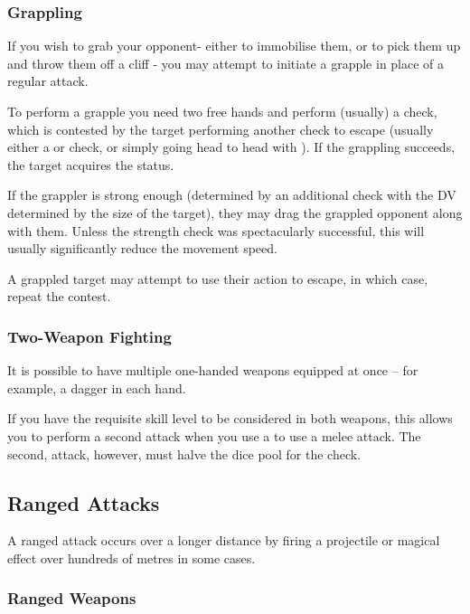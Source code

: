 \subsubsection{Grappling}

If you wish to grab your opponent- either to immobilise them, or to pick them up and throw them off a cliff - you may attempt to initiate a grapple in place of a regular attack. 

To perform a grapple you need two free hands and perform (usually) a  check, which is contested by the target performing another check to escape (usually either a  or  check, or simply going head to head with ). If the grappling succeeds, the target acquires the  status. 

If the grappler is strong enough (determined by an additional  check with the DV determined by the size of the target), they may drag the grappled opponent along with them. Unless the strength check was spectacularly successful, this will usually significantly reduce the movement speed. 

A grappled target may attempt to use their action to escape, in which case, repeat the contest. 

\subsubsection{Two-Weapon Fighting}

It is possible to have multiple one-handed weapons equipped at once -- for example, a dagger in each hand. 

If you have the requisite skill level to be considered  in both weapons, this allows you to perform a second attack when you use a  to use a melee attack. The second, attack, however, must halve the dice pool for the check.


\subsection{Ranged Attacks}

A ranged attack occurs over a longer distance by firing a projectile or magical effect over hundreds of metres in some cases. 

\subsubsection{Ranged Weapons}

